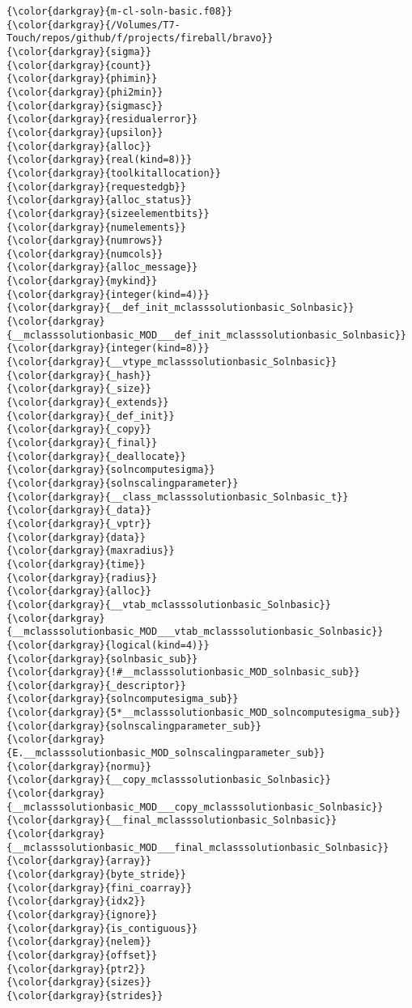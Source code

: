 {{\begin{Verbatim}[commandchars=\\\{\}]
{\color{darkgray}{m-cl-soln-basic.f08}}
{\color{darkgray}{/Volumes/T7-Touch/repos/github/f/projects/fireball/bravo}}
{\color{darkgray}{sigma}}
{\color{darkgray}{count}}
{\color{darkgray}{phimin}}
{\color{darkgray}{phi2min}}
{\color{darkgray}{sigmasc}}
{\color{darkgray}{residualerror}}
{\color{darkgray}{upsilon}}
{\color{darkgray}{alloc}}
{\color{darkgray}{real(kind=8)}}
{\color{darkgray}{toolkitallocation}}
{\color{darkgray}{requestedgb}}
{\color{darkgray}{alloc_status}}
{\color{darkgray}{sizeelementbits}}
{\color{darkgray}{numelements}}
{\color{darkgray}{numrows}}
{\color{darkgray}{numcols}}
{\color{darkgray}{alloc_message}}
{\color{darkgray}{mykind}}
{\color{darkgray}{integer(kind=4)}}
{\color{darkgray}{__def_init_mclasssolutionbasic_Solnbasic}}
{\color{darkgray}{__mclasssolutionbasic_MOD___def_init_mclasssolutionbasic_Solnbasic}}
{\color{darkgray}{integer(kind=8)}}
{\color{darkgray}{__vtype_mclasssolutionbasic_Solnbasic}}
{\color{darkgray}{_hash}}
{\color{darkgray}{_size}}
{\color{darkgray}{_extends}}
{\color{darkgray}{_def_init}}
{\color{darkgray}{_copy}}
{\color{darkgray}{_final}}
{\color{darkgray}{_deallocate}}
{\color{darkgray}{solncomputesigma}}
{\color{darkgray}{solnscalingparameter}}
{\color{darkgray}{__class_mclasssolutionbasic_Solnbasic_t}}
{\color{darkgray}{_data}}
{\color{darkgray}{_vptr}}
{\color{darkgray}{data}}
{\color{darkgray}{maxradius}}
{\color{darkgray}{time}}
{\color{darkgray}{radius}}
{\color{darkgray}{alloc}}
{\color{darkgray}{__vtab_mclasssolutionbasic_Solnbasic}}
{\color{darkgray}{__mclasssolutionbasic_MOD___vtab_mclasssolutionbasic_Solnbasic}}
{\color{darkgray}{logical(kind=4)}}
{\color{darkgray}{solnbasic_sub}}
{\color{darkgray}{!#__mclasssolutionbasic_MOD_solnbasic_sub}}
{\color{darkgray}{_descriptor}}
{\color{darkgray}{solncomputesigma_sub}}
{\color{darkgray}{5*__mclasssolutionbasic_MOD_solncomputesigma_sub}}
{\color{darkgray}{solnscalingparameter_sub}}
{\color{darkgray}{E.__mclasssolutionbasic_MOD_solnscalingparameter_sub}}
{\color{darkgray}{normu}}
{\color{darkgray}{__copy_mclasssolutionbasic_Solnbasic}}
{\color{darkgray}{__mclasssolutionbasic_MOD___copy_mclasssolutionbasic_Solnbasic}}
{\color{darkgray}{__final_mclasssolutionbasic_Solnbasic}}
{\color{darkgray}{__mclasssolutionbasic_MOD___final_mclasssolutionbasic_Solnbasic}}
{\color{darkgray}{array}}
{\color{darkgray}{byte_stride}}
{\color{darkgray}{fini_coarray}}
{\color{darkgray}{idx2}}
{\color{darkgray}{ignore}}
{\color{darkgray}{is_contiguous}}
{\color{darkgray}{nelem}}
{\color{darkgray}{offset}}
{\color{darkgray}{ptr2}}
{\color{darkgray}{sizes}}
{\color{darkgray}{strides}}

\end{Verbatim}}}

